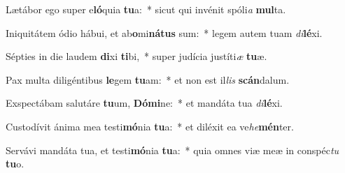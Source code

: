 \item Lætábor ego super e\textbf{ló}quia \textbf{tu}a:~* sicut qui invénit spóli\textit{a} \textbf{mul}ta.
\item Iniquitátem ódio hábui, et ab\textbf{o}mi\textbf{ná}\textbf{tus} sum:~* legem autem tuam \textit{di}\textbf{lé}xi.
\item Sépties in die laudem \textbf{di}xi \textbf{ti}bi,~* super judícia justíti\textit{æ} \textbf{tu}æ.
\item Pax multa diligéntibus \textbf{le}gem \textbf{tu}am:~* et non est il\textit{lis} \textbf{scán}dalum.
\item Exspectábam salutáre \textbf{tu}um, \textbf{Dó}\textbf{mi}ne:~* et mandáta tua \textit{di}\textbf{lé}xi.
\item Custodívit ánima mea testi\textbf{mó}nia \textbf{tu}a:~* et diléxit ea ve\textit{he}\textbf{mén}ter.
\item Servávi mandáta tua, et testi\textbf{mó}nia \textbf{tu}a:~* quia omnes viæ meæ in conspéc\textit{tu} \textbf{tu}o.
